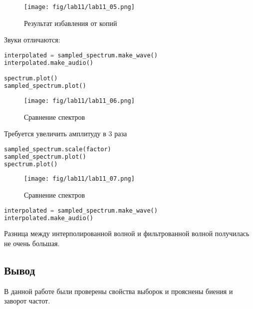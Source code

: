 \begin{figure}[H]
	\begin{center}
		\texttt{[image: fig/lab11/lab11\_05.png]}
		\caption{Результат избавления от копий}
	\end{center}
\end{figure}

Звуки отличаются:

\begin{lstlisting}[language=Python]
interpolated = sampled_spectrum.make_wave()
interpolated.make_audio()

spectrum.plot()
sampled_spectrum.plot()
\end{lstlisting}

\begin{figure}[H]
	\begin{center}
		\texttt{[image: fig/lab11/lab11\_06.png]}
		\caption{Сравнение спектров}
	\end{center}
\end{figure}

Требуется увеличить амплитуду в 3 раза

\begin{lstlisting}[language=Python]
sampled_spectrum.scale(factor)
sampled_spectrum.plot()
spectrum.plot()
\end{lstlisting}

\begin{figure}[H]
	\begin{center}
		\texttt{[image: fig/lab11/lab11\_07.png]}
		\caption{Сравнение спектров}
	\end{center}
\end{figure}

\begin{lstlisting}[language=Python]
interpolated = sampled_spectrum.make_wave()
interpolated.make_audio()
\end{lstlisting}

Разница между интерполированной волной и фильтрованной волной получилась не очень большая.


\subsection{Вывод}

В данной работе были проверены свойства выборок и прояснены биения и заворот частот.